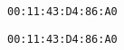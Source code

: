 \documentclass[a4paper]{article}
\begin{document}
\verb|00:11:43:D4:86:A0|

\makeatletter\nofrench@punctuation
\verb|00:11:43:D4:86:A0|
\french@punctuation\makeatother
\end{document}
